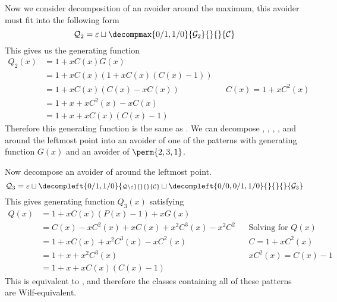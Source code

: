 Now we consider decomposition of an avoider
 around the maximum,
this avoider must fit into the following form
\begin{equation*}
    \mathcal{Q}_2 = \varepsilon \sqcup
    \decompmax{0/1,1/0}{\mathcal{G}_2}{}{}{\mathcal{C}}
\end{equation*}
This gives us the generating function
\begin{equation*}
    \begin{aligned}
        Q_2(x) &= 1+xC(x)G(x)\\
        &= 1+xC(x)(1+xC(x)(C(x)-1))\\
        &= 1 +xC(x)(C(x)-xC(x)) && C(x) = 1+xC^2(x)\\
        &= 1 +x + xC^2(x) - xC(x) \\
        &= 1 +x + xC(x)(C(x)-1)
    \end{aligned}
\end{equation*}
Therefore this generating function is the same as .
We can decompose
,
,
,
,
and  around the leftmost point
into an avoider of one of the patterns with generating function \(G(x)\) and
an avoider of \(\perm{2,3,1}\).

Now decompose an avoider of 
around the leftmost point.
\begin{equation*}
    \mathcal{Q}_3 = \varepsilon \sqcup
    \decompleft{0/1,1/0}{\scriptstyle \mathcal{Q}\setminus\varepsilon}{}{}{\mathcal{C}}
    \sqcup \decompleft{0/0,0/1,1/0}{}{}{}{\mathcal{G}_3}
\end{equation*}
This gives generating function \(Q_3(x)\) satisfying
\begin{equation*}
    \begin{aligned}
        Q(x) &= 1 +xC(x)(P(x)-1) + xG(x)\\
        &= C(x) - xC^2(x) + xC(x) +x^2C^3(x) - x^2C^2 && \text{Solving for \(Q(x)\)}\\
        &= 1 + xC(x) +x^2C^3(x)-xC^2(x) && C = 1+xC^2(x)\\
        &= 1 + x + x^2C^3(x) && xC^2(x) = C(x)-1\\
        &= 1 + x + xC(x)(C(x)-1)
    \end{aligned}
\end{equation*}
This is equivalent to , and therefore
the classes containing all of these patterns are Wilf-equivalent.
